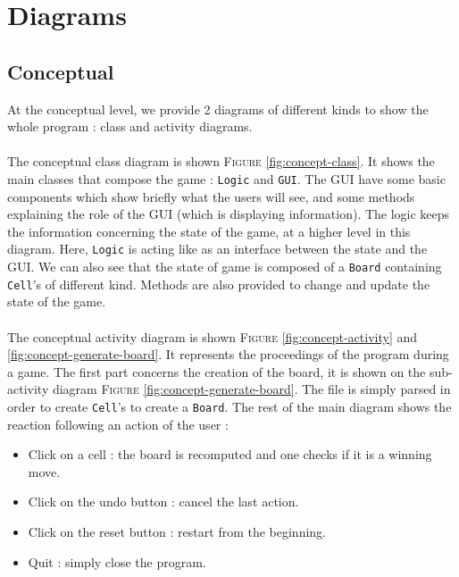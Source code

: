 \documentclass[a4paper,11pt]{article}
\begin{document}
\section{Diagrams}
\label{sec:diagrams}

	
	\subsection{Conceptual}

At the conceptual level, we provide 2 diagrams of different kinds to show the whole program : class and activity diagrams.

\paragraph{}

The conceptual class diagram is shown \textsc{Figure} \ref{fig:concept-class}. It shows the main classes that compose the game : \texttt{Logic} and \texttt{GUI}. The GUI have some basic components which show briefly what the users will see, and some methods explaining the role of the GUI (which is displaying information). The logic keeps the information concerning the state of the game, at a higher level in this diagram. Here, \texttt{Logic} is acting like as an interface between the state and the GUI. We can also see that the state of game is composed of a \texttt{Board} containing \texttt{Cell}'s of different kind. Methods are also provided to change and update the state of the game.

\paragraph{}

The conceptual activity diagram is shown \textsc{Figure} \ref{fig:concept-activity} and \ref{fig:concept-generate-board}. It represents the proceedings of the program during a game. The first part concerns the creation of the board, it is shown on the sub-activity diagram \textsc{Figure} \ref{fig:concept-generate-board}. The file is simply parsed in order to create \texttt{Cell}'s to create a \texttt{Board}. The rest of the main diagram shows the reaction following an action of the user : 
\begin{itemize}
	\item Click on a cell : the board is recomputed and one checks if it is a winning move.
	\item Click on the undo button : cancel the last action.
	\item Click on the reset button : restart from the beginning.
	\item Quit : simply close the program.
\end{itemize}
\end{document}

